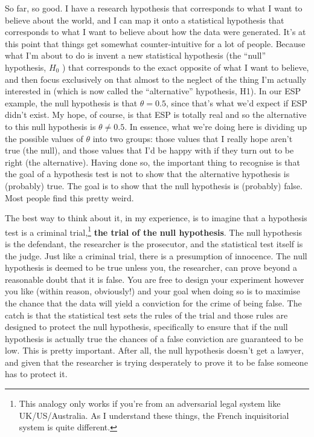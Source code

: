 \documentclass[
  a4paper,
]{book}
\begin{document}
So far, so good. I have a research hypothesis that corresponds to what I
want to believe about the world, and I can map it onto a statistical
hypothesis that corresponds to what I want to believe about how the data
were generated. It's at this point that things get somewhat
counter-intuitive for a lot of people. Because what I'm about to do is
invent a new statistical hypothesis (the ``null'' hypothesis, \(H_0\) )
that corresponds to the exact opposite of what I want to believe, and
then focus exclusively on that almost to the neglect of the thing I'm
actually interested in (which is now called the ``alternative''
hypothesis, H1). In our ESP example, the null hypothesis is that
\(\theta = 0.5\), since that's what we'd expect if ESP didn't exist. My
hope, of course, is that ESP is totally real and so the alternative to
this null hypothesis is \(\theta \neq 0.5\). In essence, what we're
doing here is dividing up the possible values of \(\theta\) into two
groups: those values that I really hope aren't true (the null), and
those values that I'd be happy with if they turn out to be right (the
alternative). Having done so, the important thing to recognise is that
the goal of a hypothesis test is not to show that the alternative
hypothesis is (probably) true. The goal is to show that the null
hypothesis is (probably) false. Most people find this pretty weird.

The best way to think about it, in my experience, is to imagine that a
hypothesis test is a criminal trial,\footnote{This analogy only works if
  you're from an adversarial legal system like UK/US/Australia. As I
  understand these things, the French inquisitorial system is quite
  different.} \textbf{the trial of the null hypothesis}. The null
hypothesis is the defendant, the researcher is the prosecutor, and the
statistical test itself is the judge. Just like a criminal trial, there
is a presumption of innocence. The null hypothesis is deemed to be true
unless you, the researcher, can prove beyond a reasonable doubt that it
is false. You are free to design your experiment however you like
(within reason, obviously!) and your goal when doing so is to maximise
the chance that the data will yield a conviction for the crime of being
false. The catch is that the statistical test sets the rules of the
trial and those rules are designed to protect the null hypothesis,
specifically to ensure that if the null hypothesis is actually true the
chances of a false conviction are guaranteed to be low. This is pretty
important. After all, the null hypothesis doesn't get a lawyer, and
given that the researcher is trying desperately to prove it to be false
someone has to protect it.
\end{document}
